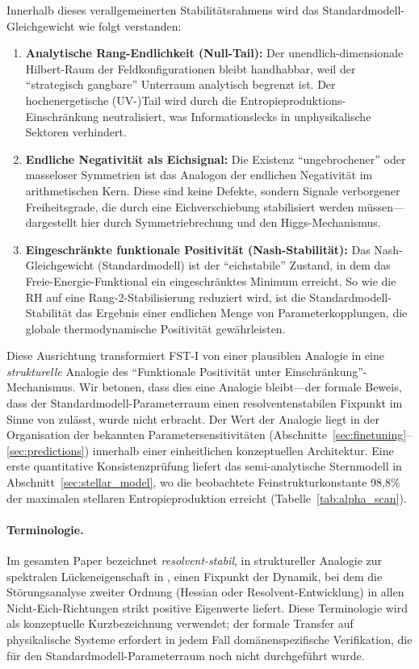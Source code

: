 \documentclass[12pt,a4paper]{article}
\theoremstyle{remark}
\begin{document}
Innerhalb dieses verallgemeinerten Stabilit\"atsrahmens wird das Standardmodell-Gleichgewicht wie folgt verstanden:
\begin{enumerate}[label=\alph*)]
    \item \textbf{Analytische Rang-Endlichkeit (Null-Tail):} Der unendlich-dimensionale Hilbert-Raum der Feldkonfigurationen bleibt handhabbar, weil der ``strategisch gangbare'' Unterraum analytisch begrenzt ist. Der hochenergetische (UV-)Tail wird durch die Entropieproduktions-Einschr\"ankung neutralisiert, was Informationslecks in unphysikalische Sektoren verhindert.
    \item \textbf{Endliche Negativit\"at als Eichsignal:} Die Existenz ``ungebrochener'' oder masseloser Symmetrien ist das Analogon der endlichen Negativit\"at im arithmetischen Kern. Diese sind keine Defekte, sondern Signale verborgener Freiheitsgrade, die durch eine Eichverschiebung stabilisiert werden m\"ussen---dargestellt hier durch Symmetriebrechung und den Higgs-Mechanismus.
    \item \textbf{Eingeschr\"ankte funktionale Positivit\"at (Nash-Stabilit\"at):} Das Nash-Gleichgewicht (Standardmodell) ist der ``eichstabile'' Zustand, in dem das Freie-Energie-Funktional ein eingeschr\"anktes Minimum erreicht. So wie die RH auf eine Rang-2-Stabilisierung reduziert wird, ist die Standardmodell-Stabilit\"at das Ergebnis einer endlichen Menge von Parameterkopplungen, die globale thermodynamische Positivit\"at gew\"ahrleisten.
\end{enumerate}

Diese Ausrichtung transformiert FST-I von einer plausiblen Analogie in eine \emph{strukturelle} Analogie des ``Funktionale Positivit\"at unter Einschr\"ankung''-Mechanismus. Wir betonen, dass dies eine Analogie bleibt---der formale Beweis, dass der Standardmodell-Parameterraum einen resolventenstabilen Fixpunkt im Sinne von \citep{GeigerRH2026b} zul\"asst, wurde nicht erbracht. Der Wert der Analogie liegt in der Organisation der bekannten Parametersensitivit\"aten (Abschnitte~\ref{sec:finetuning}--\ref{sec:predictions}) innerhalb einer einheitlichen konzeptuellen Architektur. Eine erste quantitative Konsistenzpr\"ufung liefert das semi-analytische Sternmodell in Abschnitt~\ref{sec:stellar_model}, wo die beobachtete Feinstrukturkonstante 98,8\% der maximalen stellaren Entropieproduktion erreicht (Tabelle~\ref{tab:alpha_scan}).

\paragraph{Terminologie.} Im gesamten Paper bezeichnet \emph{resolvent-stabil}, in struktureller Analogie zur spektralen L\"uckeneigenschaft in \citep{GeigerRH2026b}, einen Fixpunkt der Dynamik, bei dem die St\"orungsanalyse zweiter Ordnung (Hessian oder Resolvent-Entwicklung) in allen Nicht-Eich-Richtungen strikt positive Eigenwerte liefert. Diese Terminologie wird als konzeptuelle Kurzbezeichnung verwendet; der formale Transfer auf physikalische Systeme erfordert in jedem Fall dom\"anenspezifische Verifikation, die f\"ur den Standardmodell-Parameterraum noch nicht durchgef\"uhrt wurde.
\end{document}
